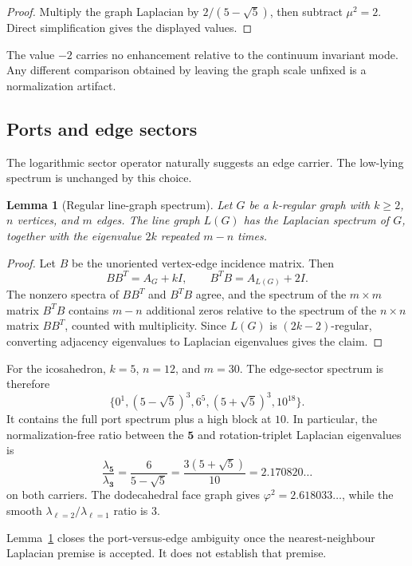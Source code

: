 \documentclass[11pt]{article}
\newtheorem{lemma}[theorem]{Lemma}
\theoremstyle{remark}
\begin{document}
\begin{proof}
Multiply the graph Laplacian by \(2/(5-\sqrt5)\), then subtract
\(\mu^2=2\). Direct simplification gives the displayed values.
\end{proof}

The value \(-2\) carries no enhancement relative to the continuum invariant
mode. Any different comparison obtained by leaving the graph scale unfixed
is a normalization artifact.

\subsection{Ports and edge sectors}

The logarithmic sector operator naturally suggests an edge carrier. The
low-lying spectrum is unchanged by this choice.

\begin{lemma}[Regular line-graph spectrum]
\label{lem:linegraph}
Let \(G\) be a \(k\)-regular graph with \(k\geq2\), \(n\) vertices, and \(m\)
edges. The
line graph \(L(G)\) has the Laplacian spectrum of \(G\), together with the
eigenvalue \(2k\) repeated \(m-n\) times.
\end{lemma}

\begin{proof}
Let \(B\) be the unoriented vertex-edge incidence matrix. Then
\[
BB^T=A_G+kI,
\qquad
B^TB=A_{L(G)}+2I.
\]
The nonzero spectra of \(BB^T\) and \(B^TB\) agree, and the spectrum of the
\(m\times m\) matrix \(B^TB\) contains \(m-n\) additional zeros relative to
the spectrum of the \(n\times n\) matrix \(BB^T\), counted with
multiplicity. Since \(L(G)\) is \((2k-2)\)-regular, converting adjacency
eigenvalues to Laplacian eigenvalues gives the claim.
\end{proof}

For the icosahedron, \(k=5\), \(n=12\), and \(m=30\). The edge-sector
spectrum is therefore
\[
\{0^1,(5-\sqrt5)^3,6^5,(5+\sqrt5)^3,10^{18}\}.
\]
It contains the full port spectrum plus a high block at \(10\). In
particular, the normalization-free ratio between the \(\mathbf5\) and
rotation-triplet Laplacian eigenvalues is
\[
\frac{\lambda_{\mathbf5}}{\lambda_{\mathbf3}}
=\frac6{5-\sqrt5}
=\frac{3(5+\sqrt5)}{10}
=2.170820\ldots
\]
on both carriers. The dodecahedral face graph gives
\(\varphi^2=2.618033\ldots\), while the smooth
\(\lambda_{\ell=2}/\lambda_{\ell=1}\) ratio is \(3\).

Lemma~\ref{lem:linegraph} closes the port-versus-edge ambiguity once the
nearest-neighbour Laplacian premise is accepted. It does not establish that
premise.
\end{document}

